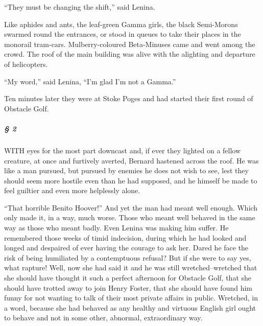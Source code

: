 \documentclass[12pt]{report}
\begin{document}
``They must be changing the shift,'' said Lenina.

Like aphides and ants, the leaf-green Gamma girls, the black Semi-Morons
swarmed round the entrances, or stood in queues to take their places in
the monorail tram-cars. Mulberry-coloured Beta-Minuses came and went
among the crowd. The roof of the main building was alive with the
alighting and departure of helicopters.

``My word,'' said Lenina, ``I'm glad I'm not a Gamma.''

Ten minutes later they were at Stoke Poges and had started their first
round of Obstacle Golf.

\mbox{}%
\subparagraph{§ 2}\label{section}

WITH eyes for the most part downcast and, if ever they lighted on a
fellow creature, at once and furtively averted, Bernard hastened across
the roof. He was like a man pursued, but pursued by enemies he does not
wish to see, lest they should seem more hostile even than he had
supposed, and he himself be made to feel guiltier and even more
helplessly alone.

``That horrible Benito Hoover!'' And yet the man had meant well enough.
Which only made it, in a way, much worse. Those who meant well behaved
in the same way as those who meant badly. Even Lenina was making him
suffer. He remembered those weeks of timid indecision, during which he
had looked and longed and despaired of ever having the courage to ask
her. Dared he face the risk of being humiliated by a contemptuous
refusal? But if she were to say yes, what rapture! Well, now she had
said it and he was still wretched--wretched that she should have thought
it such a perfect afternoon for Obstacle Golf, that she should have
trotted away to join Henry Foster, that she should have found him funny
for not wanting to talk of their most private affairs in public.
Wretched, in a word, because she had behaved as any healthy and virtuous
English girl ought to behave and not in some other, abnormal,
extraordinary way.
\end{document}
